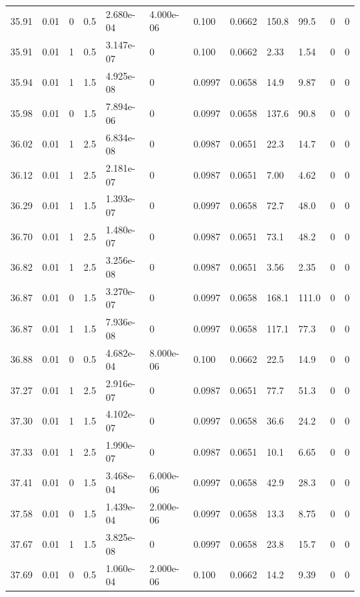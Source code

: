 \documentclass[preview]{standalone}
\begin{document}
{{{{{{{{\begin{tabular}{L{1.2cm}C{1.2cm} C{0.3cm}C{0.5cm} C{1.4cm}C{1.4cm} C{1.4cm}C{1.4cm} C{1.6cm}C{1.6cm} C{1.6cm}C{1.6cm}}
  35.91  &  0.01  & 0     & 0.5 &  2.680e-04  & 4.000e-06  &  0.100&   0.0662& 150.8 & 99.5   &  0 & 0  \\ 
  35.91  &  0.01  & 1     & 0.5 &  3.147e-07  & 0  &  0.100&   0.0662& 2.33 & 1.54   &  0 & 0  \\ 
  35.94  &  0.01  & 1     & 1.5 &  4.925e-08  & 0  &  0.0997&   0.0658& 14.9 & 9.87   &  0 & 0  \\ 
  35.98  &  0.01  & 0     & 1.5 &  7.894e-06  & 0  &  0.0997&   0.0658& 137.6 & 90.8   &  0 & 0  \\ 
  36.02  &  0.01  & 1     & 2.5 &  6.834e-08  & 0  &  0.0987&   0.0651& 22.3 & 14.7   &  0 & 0  \\ 
  36.12  &  0.01  & 1     & 2.5 &  2.181e-07  & 0  &  0.0987&   0.0651& 7.00 & 4.62   &  0 & 0  \\ 
  36.29  &  0.01  & 1     & 1.5 &  1.393e-07  & 0  &  0.0997&   0.0658& 72.7 & 48.0   &  0 & 0  \\ 
  36.70  &  0.01  & 1     & 2.5 &  1.480e-07  & 0  &  0.0987&   0.0651& 73.1 & 48.2   &  0 & 0  \\ 
  36.82  &  0.01  & 1     & 2.5 &  3.256e-08  & 0  &  0.0987&   0.0651& 3.56 & 2.35   &  0 & 0  \\ 
  36.87  &  0.01  & 0     & 1.5 &  3.270e-07  & 0  &  0.0997&   0.0658& 168.1 & 111.0   &  0 & 0  \\ 
  36.87  &  0.01  & 1     & 1.5 &  7.936e-08  & 0  &  0.0997&   0.0658& 117.1 & 77.3   &  0 & 0  \\ 
  36.88  &  0.01  & 0     & 0.5 &  4.682e-04  & 8.000e-06  &  0.100&   0.0662& 22.5 & 14.9   &  0 & 0  \\ 
  37.27  &  0.01  & 1     & 2.5 &  2.916e-07  & 0  &  0.0987&   0.0651& 77.7 & 51.3   &  0 & 0  \\ 
  37.30  &  0.01  & 1     & 1.5 &  4.102e-07  & 0  &  0.0997&   0.0658& 36.6 & 24.2   &  0 & 0  \\ 
  37.33  &  0.01  & 1     & 2.5 &  1.990e-07  & 0  &  0.0987&   0.0651& 10.1 & 6.65   &  0 & 0  \\ 
  37.41  &  0.01  & 0     & 1.5 &  3.468e-04  & 6.000e-06  &  0.0997&   0.0658& 42.9 & 28.3   &  0 & 0  \\ 
  37.58  &  0.01  & 0     & 1.5 &  1.439e-04  & 2.000e-06  &  0.0997&   0.0658& 13.3 & 8.75   &  0 & 0  \\ 
  37.67  &  0.01  & 1     & 1.5 &  3.825e-08  & 0  &  0.0997&   0.0658& 23.8 & 15.7   &  0 & 0  \\ 
  37.69  &  0.01  & 0     & 0.5 &  1.060e-04  & 2.000e-06  &  0.100&   0.0662& 14.2 & 9.39   &  0 & 0  \\ 

\end{tabular}}}}}}}}}
\end{document}
